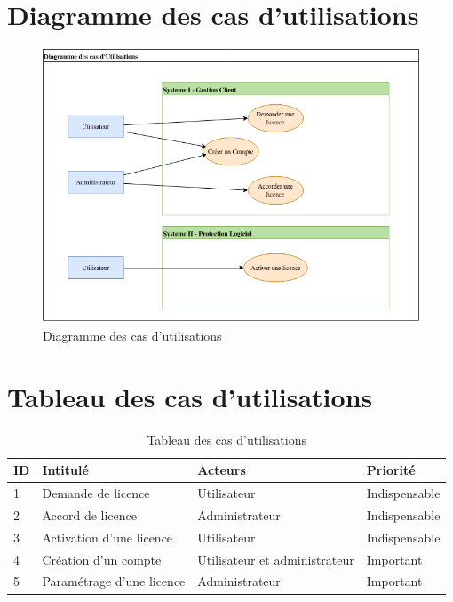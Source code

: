 \newpage

\section{Diagramme des cas d'utilisations}

\begin{figure}[h]
	\centering
	\includegraphics[width=16cm]{main/png/Util.png}
	\caption{Diagramme des cas d'utilisations}
	\label{fig:fig2}
\end{figure}

\section{Tableau des cas d'utilisations}

\begin{table}[h]
	\centering
	\begin{tabular}{ | m{0.6cm} | m{6cm} | m{6cm}| m{3cm} | } 
                \hline
		\textbf{ID} & \textbf{Intitulé} & \textbf{Acteurs} & \textbf{Priorité} \\
                \hline
			1 & Demande de licence & Utilisateur & Indispensable \\
                \hline
			2 & Accord de licence & Administrateur & Indispensable \\
                \hline
			3 & Activation d'une licence & Utilisateur & Indispensable \\
		\hline
			4 & Création d'un compte & Utilisateur et administrateur & Important \\
		\hline
			5 & Paramétrage d'une licence & Administrateur & Important \\
		\hline
        \end{tabular}
	\caption{Tableau des cas d'utilisations}
	\label{tab:tab1}
\end{table}
\newpage

